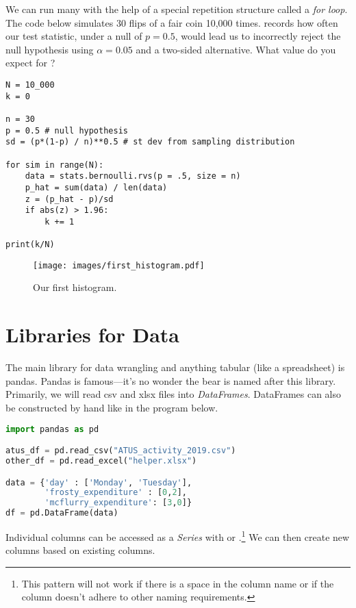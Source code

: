 \documentclass{article}
\begin{document}
\noindent We can run many with the help of a special repetition structure called a \emph{for loop}. The code below simulates 30 flips of a fair coin 10,000 times.  records how often our test statistic, under a null of $p= 0.5$, would lead us to incorrectly reject the null hypothesis using $\alpha = 0.05$ and a two-sided alternative. What value do you expect for ? 

\begin{lstlisting}
N = 10_000
k = 0

n = 30
p = 0.5 # null hypothesis
sd = (p*(1-p) / n)**0.5 # st dev from sampling distribution

for sim in range(N):
    data = stats.bernoulli.rvs(p = .5, size = n)
    p_hat = sum(data) / len(data)
    z = (p_hat - p)/sd
    if abs(z) > 1.96:
        k += 1

print(k/N)
\end{lstlisting}


\begin{figure}
    \centering
    \texttt{[image: images/first\_histogram.pdf]}
    \caption{Our first histogram.}
    \label{fig:hist}
\end{figure}




\section{Libraries for Data}

The main library for data wrangling and anything tabular (like a spreadsheet) is pandas. Pandas is famous---it's no wonder the bear is named after this library. Primarily, we will read csv and xlsx files into \emph{DataFrames}. DataFrames can also be constructed by hand like in the program below.

\begin{lstlisting}[language = Python]
import pandas as pd

atus_df = pd.read_csv("ATUS_activity_2019.csv")
other_df = pd.read_excel("helper.xlsx")

data = {'day' : ['Monday', 'Tuesday'], 
        'frosty_expenditure' : [0,2],
        'mcflurry_expenditure': [3,0]}
df = pd.DataFrame(data)
\end{lstlisting}

Individual columns can be accessed as a \emph{Series} with  or .\footnote{This pattern will not work if there is a space in the column name or if the column doesn't adhere to other naming requirements.} We can then create new columns based on existing columns. 
\end{document}
